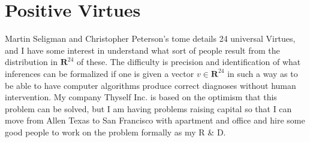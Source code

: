 \documentclass{amsart}
\begin{document}
\section{Positive Virtues}
Martin Seligman and Christopher Peterson's tome details 24 universal Virtues, and I have some interest in understand what sort of people result from the distribution in $\mathbf{R}^{24}$ of these. The difficulty is precision and identification of what inferences can be formalized if one is given a vector $v \in \mathbf{R}^{24}$ in such a way as to be able to have computer algorithms produce correct diagnoses without human intervention.  My company Thyself Inc. is based on the optimism that this problem can be solved, but I am having problems raising capital so that I can move from Allen Texas to San Francisco with apartment and office and hire some good people to work on the problem formally as my R \& D. 
\end{document}

